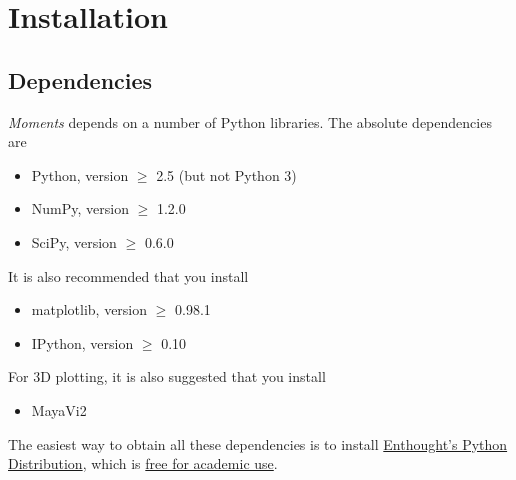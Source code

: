 \documentclass[12pt]{article}
\makeatletter
\newcommand{\dadi}{$\partial$a$\partial$i\xspace}
\newcommand{\py}[1]{\lstinline[breaklines=true,language=Python, showstringspaces=False]@#1@}
\makeatother
\begin{document}
\section{Installation}

\subsection{Dependencies}

\textit{Moments} depends on a number of Python libraries. The absolute dependencies are
\begin{itemize}
\item Python, version $\geq$ 2.5 (but not Python 3)
\item NumPy, version $\geq$ 1.2.0
\item SciPy, version $\geq$ 0.6.0
\end{itemize}
It is also recommended that you install
\begin{itemize}
\item matplotlib, version $\geq$ 0.98.1
\item IPython, version $\geq$ 0.10
\end{itemize}
For 3D plotting, it is also suggested that you install
\begin{itemize}
\item MayaVi2
\end{itemize}

The easiest way to obtain all these dependencies is to install \href{http://www.enthought.com/products/epd.php}{Enthought's Python Distribution}, which is \href{http://www.enthought.com/products/edudownload.php}{free for academic use}.


\end{document}
